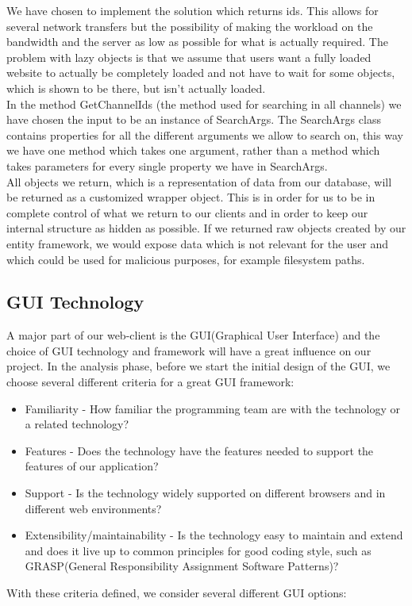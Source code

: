 \documentclass[a4paper,11pt,report]{article}
\begin{document}
We have chosen to implement the solution which returns ids. This allows for several network transfers but the possibility of making the workload on the bandwidth and the server as low as possible for what is actually required. The problem with lazy objects is that we assume that users want a fully loaded website to actually be completely loaded and not have to wait for some objects, which is shown to be there, but isn't actually loaded. \\
In the method GetChannelIds (the method used for searching in all channels) we have chosen the input to be an instance of SearchArgs. The SearchArgs class contains properties for all the different arguments we allow to search on, this way we have one method which takes one argument, rather than a method which takes parameters for every single property we have in SearchArgs. \\
All objects we return, which is a representation of data from our database, will be returned as a customized wrapper object. This is in order for us to be in complete control of what we return to our clients and in order to keep our internal structure as hidden as possible. If we returned raw objects created by our entity framework, we would expose data which is not relevant for the user and which could be used for malicious purposes, for example filesystem paths.

\subsection{GUI Technology}
A major part of our web-client is the GUI(Graphical User Interface) and the choice of GUI technology and framework will have a great influence on our project. In the analysis phase, before we start the initial design of the GUI, we choose several different criteria for a great GUI framework:
\begin{itemize}
\item Familiarity - How familiar the programming team are with the technology or a related technology?
\item Features - Does the technology have the features needed to support the features of our application?
\item Support - Is the technology widely supported on different browsers and in different web environments?
\item Extensibility/maintainability - Is the technology easy to maintain and extend and does it live up to common principles for good coding style, such as GRASP(General Responsibility Assignment Software Patterns)?
\end{itemize}
With these criteria defined, we consider several different GUI options:
\end{document}

